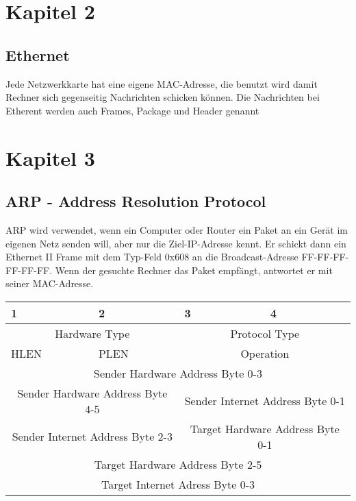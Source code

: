 \documentclass[a4paper,10pt]{scrartcl}
\begin{document}
\section{Kapitel 2}
    \subsection{Ethernet}
        Jede Netzwerkkarte hat eine eigene MAC-Adresse, die benutzt wird damit Rechner sich gegenseitig Nachrichten schicken können. Die Nachrichten bei Etherent werden auch
        Frames, Package und Header genannt
\section{Kapitel 3}
    \subsection{ARP - Address Resolution Protocol}
        ARP wird verwendet, wenn ein Computer oder Router ein Paket an ein Gerät im eigenen Netz senden will, aber nur die Ziel-IP-Adresse kennt. Er schickt dann ein Ethernet II Frame mit dem Typ-Feld 0x608 an die Broadcast-Adresse FF-FF-FF-FF-FF-FF. Wenn der gesuchte Rechner das Paket empfängt, antwortet er mit seiner MAC-Adresse.
        \begin{tabular}{|p{3cm}|p{3cm}|p{3cm}|p{3cm}|}
            \toprule 
            1 & 2 & 3 & 4  \\
            \midrule\midrule
            \multicolumn{2}{|c|}{Hardware Type} & \multicolumn{2}{|c|}{Protocol Type} \\
            \midrule
            HLEN & PLEN & \multicolumn{2}{|c|}{Operation} \\
            \midrule
            \multicolumn{4}{|c|}{Sender Hardware Address Byte 0-3} \\
            \midrule
            \multicolumn{2}{|c|}{Sender Hardware Address Byte 4-5} & \multicolumn{2}{|c|}{Sender Internet Address Byte 0-1} \\
            \midrule
            \multicolumn{2}{|c|}{Sender Internet Address Byte 2-3} & \multicolumn{2}{|c|}{Target Hardware Address Byte 0-1}\\
            \midrule
            \multicolumn{4}{|c|}{Target Hardware Address Byte 2-5}\\
            \midrule
            \multicolumn{4}{|c|}{Target Internet Adress Byte 0-3}\\
            \bottomrule
        \end{tabular}
\end{document}
